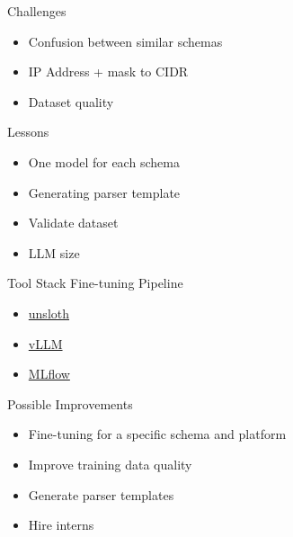 \documentclass[aspectratio=169]{beamer}
\begin{document}
\begin{frame}{Challenges}

  \begin{itemize}
    \setlength\itemsep{1em}
    \item Confusion between similar schemas
    \item IP Address + mask to CIDR
    \item Dataset quality
  \end{itemize}

\end{frame}

\begin{frame}{Lessons}

  \begin{itemize}
    \setlength\itemsep{1em}
    \item One model for each schema
    \item Generating parser template
    \item Validate dataset
    \item LLM size
  \end{itemize}

\end{frame}

\begin{frame}{Tool Stack Fine-tuning Pipeline}

  \begin{itemize}
    \setlength\itemsep{1em}
    \item \href{https://github.com/unslothai/unsloth}{unsloth}
    \item \href{https://github.com/vllm-project/vllm}{vLLM}
    \item \href{https://github.com/mlflow/mlflow}{MLflow}
  \end{itemize}

\end{frame}

\begin{frame}{Possible Improvements}

  \begin{itemize}
    \setlength\itemsep{1em}
    \item Fine-tuning for a specific schema and platform
    \item Improve training data quality
    \item Generate parser templates
    \item Hire interns
  \end{itemize}

\end{frame}
\end{document}
